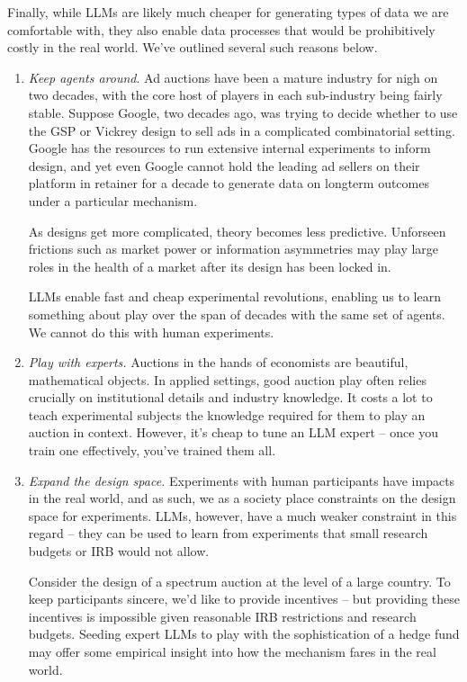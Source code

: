 \documentclass{article} %
\begin{document}
Finally, while LLMs are likely much cheaper for generating types of data we are comfortable with, they also enable data processes that would be prohibitively costly in the real world. 
We've outlined several such reasons below.

\begin{enumerate}
    \item \textit{Keep agents around}. Ad auctions have been a mature industry for nigh on two decades, with the core host of players in each sub-industry being fairly stable. 
    Suppose Google, two decades ago, was trying to decide whether to use the GSP or Vickrey design to sell ads in a complicated combinatorial setting. 
    Google has the resources to run extensive internal experiments to inform design, and yet even Google cannot hold the leading ad sellers on their platform in retainer for a decade to generate data on longterm outcomes under a particular mechanism.

    As designs get more complicated, theory becomes less predictive. 
    Unforseen frictions such as market power or information asymmetries may play large roles in the health of a market after its design has been locked in.

    LLMs enable fast and cheap experimental revolutions, enabling us to learn something about play over the span of decades with the same set of agents. 
    We cannot do this with human experiments.

    \item \textit{Play with experts.} Auctions in the hands of economists are beautiful, mathematical objects. 
    In applied settings, good auction play often relies crucially on institutional details and industry knowledge. 
    It costs a lot to teach experimental subjects the knowledge required for them to play an auction in context. 
    However, it's cheap to tune an LLM expert -- once you train one effectively, you've trained them all.

    \item \textit{Expand the design space.} Experiments with human participants have impacts in the real world, and as such, we as a society place constraints on the design space for experiments. 
    LLMs, however, have a much weaker constraint in this regard -- they can be used to learn from experiments that small research budgets or IRB would not allow. 

    Consider the design of a spectrum auction at the level of a large country. 
    To keep participants sincere, we'd like to provide incentives -- but providing these incentives is impossible given reasonable IRB restrictions and research budgets.
    Seeding expert LLMs to play with the sophistication of a hedge fund may offer some empirical insight into how the mechanism fares in the real world.


\end{enumerate}
\end{document}
